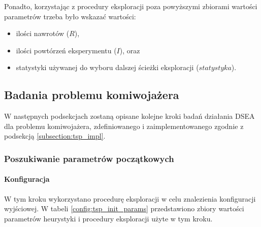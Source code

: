 \documentclass[./FM_mgr.tex]{subfiles}
\begin{document}
Ponadto, korzystając z procedury eksploracji poza powyższymi zbiorami wartości parametrów trzeba było wskazać wartości:

\begin{itemize}
	\item ilości nawrotów ($R$),
	\item ilości powtórzeń eksperymentu ($I$), oraz
	\item statystyki używanej do wyboru dalszej ścieżki eksploracji ($statystyka$).
\end{itemize}

\subsection{Badania problemu komiwojażera}

W następnych podsekcjach zostaną opisane kolejne kroki badań działania DSEA dla problemu komiwojażera, zdefiniowanego i zaimplementowanego zgodnie z podsekcją \ref{subsection:tsp_impl}.

\subsubsection{Poszukiwanie parametrów początkowych}

\paragraph{Konfiguracja}

W tym kroku wykorzystano procedurę eksploracji w celu znalezienia konfiguracji wyjściowej. W tabeli \ref{config:tsp_init_params} przedstawiono zbiory wartości parametrów heurystyki i procedury eksploracji użyte w tym kroku.
\end{document}
